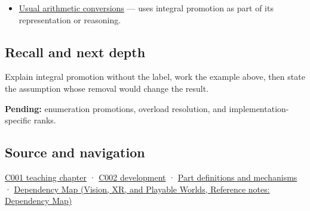 \begin{itemize}
\tightlist
\item
  \hyperref[appendix-5e2d663adf7f]{Usual arithmetic conversions} --- uses integral promotion as part of its representation or reasoning.
\end{itemize}

\subsection{Recall and next depth}\label{appendix-45303d03796a-recall-and-next-depth}

Explain integral promotion without the label, work the example above, then state the assumption whose removal would change the result.

\textbf{Pending:} enumeration promotions, overload resolution, and implementation-specific ranks.

\subsection{Source and navigation}\label{appendix-45303d03796a-source-and-navigation}

\hyperref[01-foundations-i-ch001-from-a-signal-to-an-interpretation]{C001 teaching chapter} · \hyperref[01-foundations-i-ch001-arithmetic-becomes-a-policy]{C002 development} · \hyperref[appendix-fd090d982a15]{Part definitions and mechanisms} · \href{../07-Vision-XR-and-Playable-Worlds/main.pdf\#nameddest=appendix-4ad47bdd269a}{Dependency Map (Vision, XR, and Playable Worlds, Reference notes: Dependency Map)}

